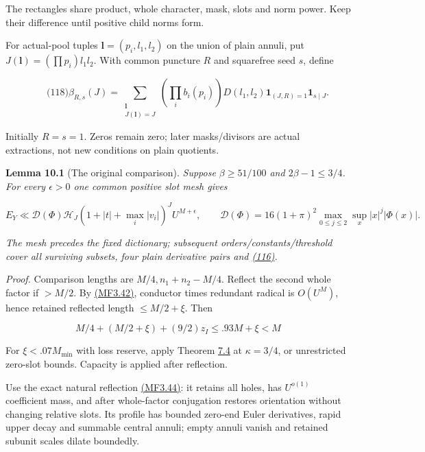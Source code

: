 The rectangles share product, whole character, mask, slots and norm power. Keep their difference until positive child norms form.

For actual-pool tuples \(\mathbf l=(p_i,l_1,l_2)\) on the union of plain annuli, put \(J(\mathbf l)=(\prod p_i)l_1l_2\). With common puncture \(R\) and squarefree seed \(s\), define

\hypertarget{sr:beta}{}

\label{sr:beta}

\[
\qquad\text{(118)}
 \beta_{R,s}(J)=
 \sum_{\substack{\mathbf l\\J(\mathbf l)=J}}
 \left(\prod_i b_i(p_i)\right)D(l_1,l_2)
 \mathbf1_{(J,R)=1}\mathbf1_{s\mid J}.
\]

Initially \(R=s=1\). Zeros remain zero; later masks/divisors are actual extractions, not new conditions on plain quotients.

\textbf{Lemma 10.1} (The original comparison). \emph{\hypertarget{sr:comparison-bound}{}\label{sr:comparison-bound} Suppose \(\beta\ge51/100\) and \(2\beta-1\le3/4\). For every \(\epsilon>0\) one common positive slot mesh gives}

\[
E_Y\ll\mathcal D(\Phi)\mathcal H_J
       (1+|t|+\max_i|v_i|)^J U^{M+\epsilon},
 \qquad
 \mathcal D(\Phi)=16(1+\pi)^2\max_{0\le j\le2}\sup_x|x|^j|\Phi(x)|.
\]

\emph{The mesh precedes the fixed dictionary; subsequent orders/constants/threshold cover all surviving subsets, four plain derivative pairs and \protect\hyperlink{sr:initial-scales}{(116)}.}

\emph{Proof.} Comparison lengths are \(M/4,n_1+n_2-M/4\). Reflect the second whole factor if \(>M/2\). By \protect\hyperlink{mf:eq:B3.42}{(MF3.42)}, conductor times redundant radical is \(O(U^M)\), hence retained reflected length \(\le M/2+\xi\). Then

\[
M/4+(M/2+\xi)+(9/2)z_I\le .93M+\xi<M
\]

For \(\xi<.07M_{\min}\) with loss reserve, apply Theorem \protect\hyperlink{mf:plain}{7.4} at \(\kappa=3/4\), or unrestricted zero-slot bounds. Capacity is applied after reflection.

Use the exact natural reflection \protect\hyperlink{mf:eq:B3.44}{(MF3.44)}: it retains all holes, has \(U^{o(1)}\) coefficient mass, and after whole-factor conjugation restores orientation without changing relative slots. Its profile has bounded zero-end Euler derivatives, rapid upper decay and summable central annuli; empty annuli vanish and retained subunit scales dilate boundedly.

